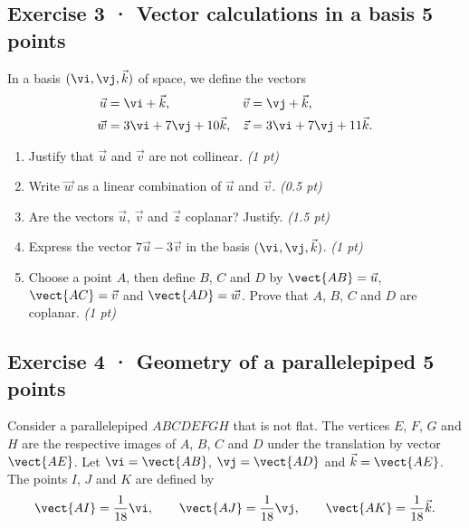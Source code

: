 \mxnewpage{}

\subsection*{Exercise 3 · Vector calculations in a basis \hfill 5 points}In a basis $(\vi,\vj,\vec k)$ of space, we define the vectors
\[\begin{aligned}\vec u&=\vi+\vec k,&\vec v&=\vj+\vec k,\\
\vec w&=3\vi+7\vj+10\vec k,&\vec z&=3\vi+7\vj+11\vec k.\end{aligned}\]

\begin{enumerate}

\item Justify that $\vec u$ and $\vec v$ are not collinear. \hfill\textit{(1 pt)}

\item Write $\vec w$ as a linear combination of $\vec u$ and $\vec v$. \hfill\textit{(0.5 pt)}

\item Are the vectors $\vec u$, $\vec v$ and $\vec z$ coplanar? Justify. \hfill\textit{(1.5 pt)}

\item Express the vector $7\vec u-3\vec v$ in the basis $(\vi,\vj,\vec k)$. \hfill\textit{(1 pt)}

\item Choose a point $A$, then define $B$, $C$ and $D$ by $\vect{AB}=\vec u$, $\vect{AC}=\vec v$ and $\vect{AD}=\vec w$. Prove that $A$, $B$, $C$ and $D$ are coplanar. \hfill\textit{(1 pt)}

\end{enumerate}

\subsection*{Exercise 4 · Geometry of a parallelepiped \hfill 5 points}Consider a parallelepiped $ABCDEFGH$ that is not flat. The vertices $E$, $F$, $G$ and $H$ are the respective images of $A$, $B$, $C$ and $D$ under the translation by vector $\vect{AE}$.
Let $\vi=\vect{AB}$, $\vj=\vect{AD}$ and $\vec k=\vect{AE}$.
The points $I$, $J$ and $K$ are defined by
\[\vect{AI}=\frac1{18}\vi,\qquad\vect{AJ}=\frac1{18}\vj,\qquad\vect{AK}=\frac1{18}\vec k.\]

